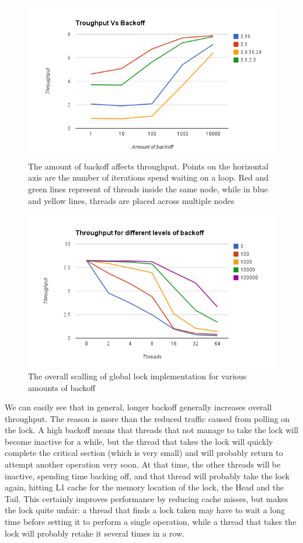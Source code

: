 \begin{figure}
 \centering
  \includegraphics[scale=0.7]{queue_global_backoff_1.png}
\caption{The amount of backoff affects throughput. Points on the horizontal axis are the number of iterations spend waiting on a loop. Red and green lines represent of threads inside the same node, while in blue and yellow lines, threads are placed across multiple nodes}
\label{queue_global_backoff_1}
\end{figure}

\begin{figure}
 \centering
  \includegraphics[scale=0.7]{queue_global_backoff_2.png}
\caption{The overall scalling of global lock implementation for various amounts of backoff}
\label{queue_global_backoff_2}
\end{figure}

We can easily see that in general, longer backoff generally increases overall throughput. The reason is more than the reduced traffic caused from polling on the lock. A high backoff means that threads that not manage to take the lock will become inactive for a while, but the thread that takes the lock will quickly complete the critical section (which is very small) and will probably return to attempt another operation very soon. At that time, the other threads will be inactive, spending time backing off, and that thread will probably take the lock again, hitting L1 cache for the memory location of the lock, the Head and the Tail. This certainly improves performance by reducing cache misses, but makes the lock quite unfair: a thread that finds a lock taken may have to wait a long time before setting it to perform a single operation, while a thread that takes the lock will probably retake it several times in a row.   

